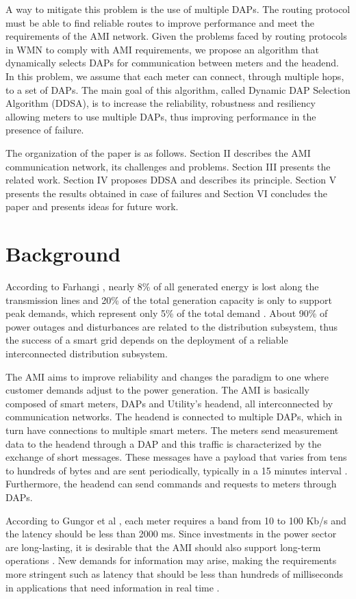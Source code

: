 \documentclass[conference]{IEEEtran}
\begin{document}
A way to mitigate this problem is the use of multiple DAPs. The routing protocol must be able to find reliable routes to improve performance and meet the requirements of the AMI network. Given the problems faced by routing protocols in WMN to comply with AMI requirements, we propose an algorithm that dynamically selects DAPs for communication between meters and the headend. In this problem, we assume that each meter can connect, through multiple hops, to a set of DAPs. The main goal of this algorithm, called Dynamic DAP Selection Algorithm (DDSA), is to increase the reliability, robustness and resiliency allowing meters to use multiple DAPs, thus improving performance in the presence of failure.

The organization of the paper is as follows. Section II describes the AMI communication network, its challenges and problems. Section III presents the related work. Section IV proposes DDSA and describes its principle. Section V presents the results obtained in case of failures and Section VI concludes the paper and presents ideas for future work.

\section{Background}

According to Farhangi \cite{Farhangi2010}, nearly 8\% of all generated energy is lost along the transmission lines and 20\% of the total generation capacity is only to support peak demands, which represent only 5\% of the total demand . About 90\% of power outages and disturbances are related to the distribution subsystem, thus the success of a smart grid depends on the deployment of a reliable interconnected distribution subsystem. 

The AMI aims to improve reliability and  changes the paradigm  to one where customer demands adjust to the power generation. The AMI is basically composed of smart meters, DAPs and Utility's headend, all interconnected by communication networks. 
The headend is connected to multiple DAPs, which in turn have connections to  multiple smart meters.
The meters send measurement data to the headend through a DAP and this traffic is characterized by the exchange of short messages. These messages have a payload that varies from tens to hundreds of bytes and are sent periodically, typically in a 15 minutes interval \cite{4547164,SRS:13}. Furthermore, the headend can send commands and requests to meters through DAPs.


According to Gungor et al \cite{Gungor2013}, each meter requires a band from 10 to 100 Kb/s and the latency should be less than 2000 ms. Since investments in the power sector are long-lasting, it is desirable that the AMI should also support long-term operations \cite{5484223}. New demands for information may arise, making the requirements more stringent such as latency that should be less than hundreds of milliseconds in applications that need information in real time \cite{5484223,Yan2013}.
\end{document}

